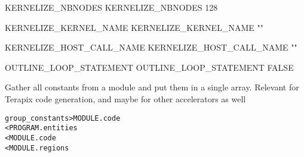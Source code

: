 \documentclass[a4paper]{report}
\newenvironment{PipsMake}{\begin{alltt}}{\end{alltt}}
\newenvironment{PipsPass}[1]{\label{pass:#1}}{}
\begin{document}
\begin{PipsProp}{KERNELIZE_NBNODES}
KERNELIZE_NBNODES 128
\end{PipsProp}
\begin{PipsProp}{KERNELIZE_KERNEL_NAME}
KERNELIZE_KERNEL_NAME ""
\end{PipsProp}
\begin{PipsProp}{KERNELIZE_HOST_CALL_NAME}
KERNELIZE_HOST_CALL_NAME ""
\end{PipsProp}

%
%
%
\begin{PipsProp}{OUTLINE_LOOP_STATEMENT}
OUTLINE_LOOP_STATEMENT FALSE
\end{PipsProp}


\begin{PipsPass}{group_constants}
Gather all constants from a module and put them in a single array.
Relevant for Terapix code generation, and maybe for other accelerators as well
\end{PipsPass}
\begin{PipsMake}
group_constants > MODULE.code
	< PROGRAM.entities
	< MODULE.code
	< MODULE.regions
\end{PipsMake}
\end{document}
